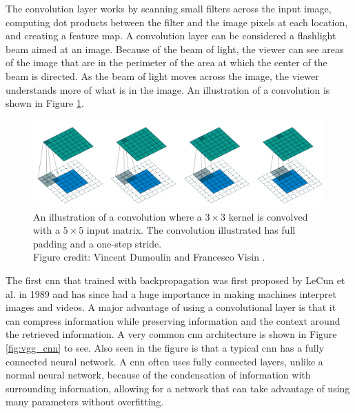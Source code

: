    The convolution layer works by scanning small filters across the input image, computing dot products between the filter and the image pixels at each location, and creating a feature map. A convolution layer can be considered a flashlight beam aimed at an image. Because of the beam of light, the viewer can see areas of the image that are in the perimeter of the area at which the center of the beam is directed. As the beam of light moves across the image, the viewer understands more of what is in the image. An illustration of a convolution is shown in Figure \ref{fig:convolutuon}.

    \begin{figure}[htb]
        \centering
        \includegraphics[width=\linewidth]{images/convolution.png}
        \caption[Illustration of a convolution.]{An illustration of a convolution where a $3 \times 3$ kernel is convolved with a $5 \times 5$ input matrix. The convolution illustrated has full padding and a one-step stride.\\
        Figure credit: Vincent Dumoulin and Francesco Visin \cite{dumoulinGuideConvolutionArithmetic2018}.}
        \label{fig:convolutuon}
    \end{figure}


    The first \gls{cnn} that trained with backpropagation was first proposed by LeCun et al. in 1989 \cite{lecunHandwrittenDigitRecognition1989} and has since had a huge importance in making machines interpret images and videos. A major advantage of using a convolutional layer is that it can compress information while preserving information and the context around the retrieved information. A very common \gls{cnn} architecture is shown in Figure \ref{fig:vgg_cnn} to see. Also seen in the figure is that a typical \gls{cnn} has a fully connected neural network. A \gls{cnn} often uses fully connected layers, unlike a normal neural network, because of the condensation of information with surrounding information, allowing for a network that can take advantage of using many parameters without overfitting.  

